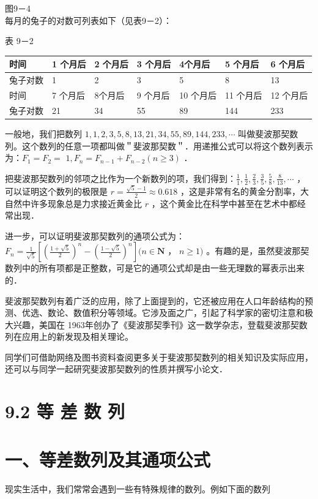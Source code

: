 \documentclass[10pt]{article}
\begin{document}
图9－4\\
每月的兔子的对数可列表如下（见表9－2）：

表 9－2

\begin{center}
\begin{tabular}{|l|l|l|l|l|l|l|}
\hline
时间 & 1 个月后 & 2 个月后 & 3 个月后 & 4个月后 & 5 个月后 & 6 个月后 \\
\hline
兔子对数 & 1 & 2 & 3 & 5 & 8 & 13 \\
\hline
时间 & 7 个月后 & 8个月后 & 9 个月后 & 10 个月后 & 11 个月后 & 12 个月后 \\
\hline
兔子对数 & 21 & 34 & 55 & 89 & 144 & 233 \\
\hline
\end{tabular}
\end{center}

一般地，我们把数列 \(1,1,2,3,5,8,13,21,34,55,89,144,233, \cdots\) 叫做斐波那契数列。这个数列的任意一项都叫做＂斐波那契数＂．用递推公式可以将这个数列表示为：\(F_{1}=F_{2}=\) \(1, F_{n}=F_{n-1}+F_{n-2}(n \geqslant 3)\) ．

把斐波那契数列的邻项之比作为一个新数列的项，我们得到：\(\frac{1}{1}, \frac{1}{2}, \frac{2}{3}, \frac{3}{5}, \frac{5}{8}, \frac{8}{13}, \cdots\) ，可以证明这个数列的极限是 \(r=\frac{\sqrt{5}-1}{2} \approx 0.618\) ，这是非常有名的黄金分割率，大自然中许多现象总是力求接近黄金比 \(r\) ，这个黄金比在科学中甚至在艺术中都经常出现．

进一步，可以证明斐波那契数列的通项公式为：\(F_{n}=\frac{1}{\sqrt{5}}\left[\left(\frac{1+\sqrt{5}}{2}\right)^{n}-\left(\frac{1-\sqrt{5}}{2}\right)^{n}\right](n \in \mathbf{N}\) ， \(n \geqslant 1)\) 。有趣的是，虽然斐波那契数列中的所有项都是正整数，可是它的通项公式却是由一些无理数的幂表示出来的．

斐波那契数列有着广泛的应用，除了上面提到的，它还被应用在人口年龄结构的预测、优选、数论、数值积分等领域。它涉及面之广，引起了科学家的密切注意和极大兴趣，美国在 1963年创办了《斐波那契季刊》这一数学杂志，登载斐波那契数列在应用上的新发现及相关理论。

同学们可借助网络及图书资料查阅更多关于斐波那契数列的相关知识及实际应用，还可以与同学一起研究斐波那契数列的性质并撰写小论文．

\section*{9.2 等 差 数 列}
\section*{一、等差数列及其通项公式}
现实生活中，我们常常会遇到一些有特殊规律的数列。例如下面的数列
\end{document}
